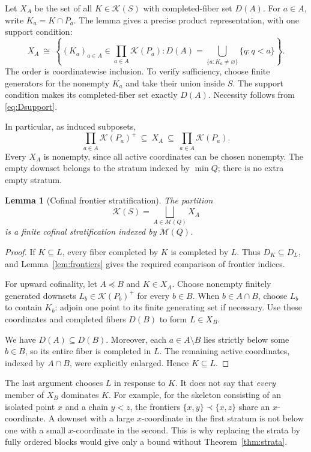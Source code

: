 \documentclass[11pt,a4paper]{article}
\newtheorem{lemma}[theorem]{Lemma}
\theoremstyle{definition}
\theoremstyle{remark}
\newcommand{\K}{\mathcal K}
\newcommand{\M}{\mathcal M}
\begin{document}
Let $X_A$ be the set of all $K\in\K(S)$ with completed-fiber set $D(A)$.
For $a\in A$, write $K_a=K\cap P_a$. The lemma gives a precise product
representation, with one support condition:
\begin{equation}\label{eq:tuplecondition}
 X_A\ \cong\
 \left\{(K_a)_{a\in A}\in\prod_{a\in A}\K(P_a):
 D(A)=\bigcup_{\{a:K_a\ne\varnothing\}}\{q:q<a\}\right\}.
\end{equation}
The order is coordinatewise inclusion. To verify sufficiency, choose
finite generators for the nonempty $K_a$ and take their union inside $S$.
The support condition makes its completed-fiber set exactly $D(A)$.
Necessity follows from \eqref{eq:Dsupport}.

In particular, as induced subposets,
\begin{equation}\label{eq:sandwich}
 \prod_{a\in A}\K(P_a)^+
 \ \subseteq\ X_A\ \subseteq\ \prod_{a\in A}\K(P_a).
\end{equation}
Every $X_A$ is nonempty, since all active coordinates can be chosen
nonempty. The empty downset belongs to the stratum indexed by $\min Q$;
there is no extra empty stratum.

\begin{lemma}[Cofinal frontier stratification]\label{lem:cofinalfrontier}
The partition
\[
 \K(S)=\bigsqcup_{A\in\M(Q)}X_A
\]
is a finite cofinal stratification indexed by $\M(Q)$.
\end{lemma}

\begin{proof}
If $K\subseteq L$, every fiber completed by $K$ is completed by $L$.
Thus $D_K\subseteq D_L$, and Lemma~\ref{lem:frontiers} gives the required
comparison of frontier indices.

For upward cofinality, let $A\preceq B$ and $K\in X_A$. Choose nonempty
finitely generated downsets $L_b\in\K(P_b)^+$ for every $b\in B$. When
$b\in A\cap B$, choose $L_b$ to contain $K_b$: adjoin one point to its
finite generating set if necessary. Use these coordinates and completed
fibers $D(B)$ to form $L\in X_B$.

We have $D(A)\subseteq D(B)$. Moreover, each $a\in A\setminus B$ lies
strictly below some $b\in B$, so its entire fiber is completed in $L$.
The remaining active coordinates, indexed by $A\cap B$, were explicitly
enlarged. Hence $K\subseteq L$.
\end{proof}

The last argument chooses $L$ in response to $K$. It does not say that
\emph{every} member of $X_B$ dominates $K$. For example, for the skeleton
consisting of an isolated point $x$ and a chain $y<z$, the frontiers
$\{x,y\}\prec\{x,z\}$ share an $x$-coordinate. A downset with a large
$x$-coordinate in the first stratum is not below one with a small
$x$-coordinate in the second. This is why replacing the strata by fully
ordered blocks would give only a bound without Theorem~\ref{thm:strata}.
\end{document}
